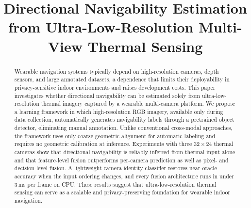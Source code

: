 \documentclass[conference,a4paper]{IEEEtran}
\begin{document}


\title{Directional Navigability Estimation from Ultra-Low-Resolution Multi-View Thermal Sensing}

\author{
}
\maketitle

\begingroup
\renewcommand{\thefootnote}{}
\endgroup

\begin{abstract} 
Wearable navigation systems typically depend on high-resolution cameras, depth sensors, and large annotated datasets, a dependence that limits their deployability in privacy-sensitive indoor environments and raises development costs. This paper investigates whether directional navigability can be estimated solely from ultra-low-resolution thermal imagery captured by a wearable multi-camera platform. We propose a learning framework in which high-resolution RGB imagery, available only during data collection, automatically generates navigability labels through a pretrained object detector, eliminating manual annotation. Unlike conventional cross-modal approaches, the framework uses only coarse geometric alignment for automatic labeling and requires no geometric calibration at inference. Experiments with three $32\times24$ thermal cameras show that directional navigability is reliably inferred from thermal input alone and that feature-level fusion outperforms per-camera prediction as well as pixel- and decision-level fusion. A lightweight camera-identity classifier restores near-oracle accuracy when the input ordering changes, and every fusion architecture runs in under 3\,ms per frame on CPU. These results suggest that ultra-low-resolution thermal sensing can serve as a scalable and privacy-preserving foundation for wearable indoor navigation.
\end{abstract}

\IEEEpeerreviewmaketitle








\FloatBarrier




\end{document}
